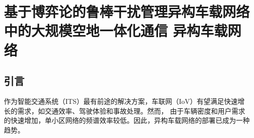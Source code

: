 \chapter{基于博弈论的鲁棒干扰管理异构车载网络中的大规模空地一体化通信
异构车载网络}

\section{引言}\label{section2-1}
作为智能交通系统（ITS）最有前途的解决方案，车联网（IoV）有望满足快速增长的需求，如交通效率、驾驶体验和事故处理。然而，
由于车辆密度和用户需求的快速增加，单小区网络的频谱效率较低\cite{TFL}。因此，异构车载网络的部署已成为一种趋势。

